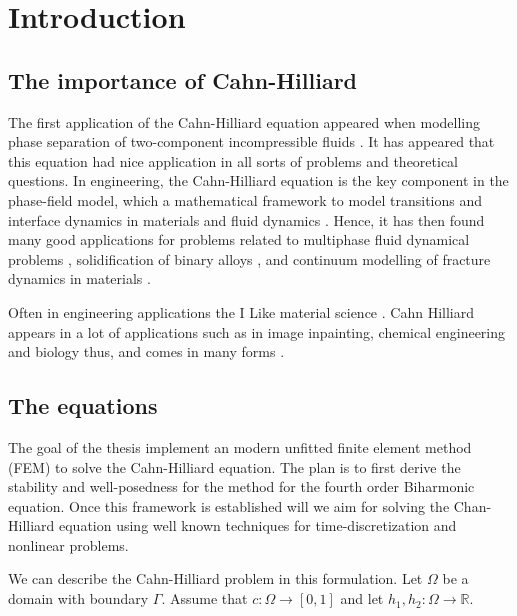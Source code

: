 \section{Introduction}\label{sec:introduction}

\subsection{The importance of Cahn-Hilliard}%
\label{sub:the_importance_of_cahn_hilliard}

The first application of the Cahn-Hilliard equation appeared when modelling phase separation of two-component incompressible fluids \cite{cahn1958free, cahn1959free}. It has appeared that this equation had nice application in all sorts of problems
and theoretical questions. In engineering, the Cahn-Hilliard equation is the key component in
the phase-field model, which a mathematical framework to model transitions and interface dynamics in materials and fluid dynamics \cite{steinbach2009phase}. Hence, it has then found many good applications for problems related to multiphase fluid dynamical problems \cite{badalassi2003computation, li2016lattice, kim2012phase, shen2010phase}, solidification of binary alloys \cite{kim1999phase, echebarria2004quantitative}, and continuum modelling of fracture dynamics in materials \cite{kuhn2010continuum}.

Often in engineering applications the
I Like material science \cite{chen2002phase}.
Cahn Hilliard appears in a lot of applications such as in image inpainting, chemical engineering and biology \cite{bressloff2014stochastic} thus, and comes in many forms \cite{miranville2017cahn}.

\subsection{The equations}%
\label{sub:the_equations}


The goal of the thesis implement an modern unfitted finite element method (FEM) to solve the Cahn-Hilliard equation. The plan is to first derive the stability and well-posedness for the method for the fourth order Biharmonic equation. Once this framework is established will we aim for solving the Chan-Hilliard equation using well known techniques for time-discretization and nonlinear problems.

We can describe the Cahn-Hilliard problem in this formulation. Let $\Omega  $ be a domain with boundary $\Gamma $. Assume that $c: \Omega  \to \left[ 0,1 \right] $ and let $h_{1},h_{2}:\Omega  \to \mathbb{R} $.


